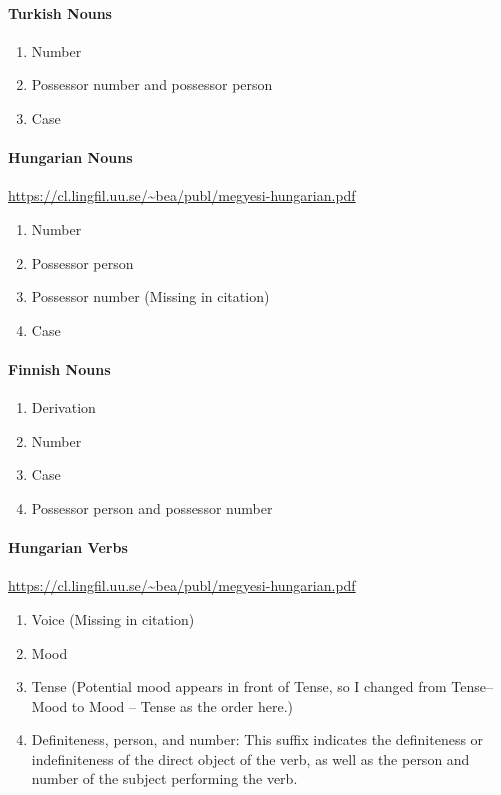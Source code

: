 \documentclass[11pt,letterpaper]{article}
\newcommand\mhahn[1]{{\color{red}(#1)}}
\newcommand\becky[1]{{\color{blue}(#1)}}
\begin{document}
\paragraph{Turkish Nouns}
\begin{enumerate}
    \item Number
    \item Possessor number and possessor person
    \item Case 
\end{enumerate}

\paragraph{Hungarian Nouns}
\url{https://cl.lingfil.uu.se/~bea/publ/megyesi-hungarian.pdf}
\begin{enumerate}
    \item Number
    \item Possessor person
    \item Possessor number \becky{Missing in citation}
    \item Case 
\end{enumerate}

\paragraph{Finnish Nouns}
\begin{enumerate}
    \item Derivation
    \item Number
    \item Case 
    \item Possessor person and possessor number
\end{enumerate}


\paragraph{Hungarian Verbs} \url{https://cl.lingfil.uu.se/~bea/publ/megyesi-hungarian.pdf}
\begin{enumerate}
    \item Voice \becky{Missing in citation}
    \item Mood
    \item Tense \mhahn{Potential mood appears in front of Tense, so I changed from Tense--Mood to Mood -- Tense as the order here.}
    \item Definiteness, person, and number: This suffix indicates the definiteness or indefiniteness of the direct object of the verb, as well as the person and number of the subject performing the verb. 
\end{enumerate}
\end{document}
